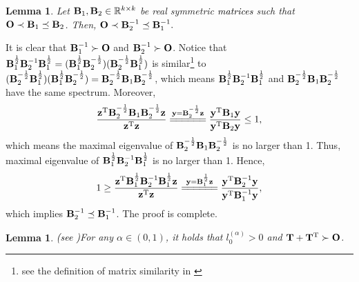 \documentclass[11pt]{article}%
\numberwithin{equation}{section}
\newtheorem{lemma}[theorem]{Lemma}
\newenvironment{proof}{\noindent{\bf Proof:}}{\hfill\fbox{}\vspace*{1mm}}
\begin{document}
\begin{lemma}\label{spdneqs}
	Let ${\bf B}_1,{\bf B}_2\in\mathbb{R}^{k\times k}$ be real symmetric \textcolor{black}{matrices} such that ${\bf O}\prec{\bf B}_1\preceq{\bf B}_2$. Then, ${\bf O}\prec{\bf B}_2^{-1}\preceq{\bf B}_1^{-1}.$
\end{lemma}
\begin{proof}	
	It is clear that ${\bf B}_1^{-1}\succ{\bf O}$ and ${\bf B}_2^{-1}\succ{\bf O}$.
	Notice that ${\bf B}_1^{\frac{1}{2}}{\bf B}_2^{-1}{\bf B}_1^{\frac{1}{2}}=({\bf B}_1^{\frac{1}{2}}{\bf B}_2^{-\frac{1}{2}})({\bf B}_2^{-\frac{1}{2}}{\bf B}_1^{\frac{1}{2}})$ is similar\footnote{see the definition of matrix similarity in \cite{horn2012matrix}} to $({\bf B}_2^{-\frac{1}{2}}{\bf B}_1^{\frac{1}{2}})({\bf B}_1^{\frac{1}{2}}{\bf B}_2^{-\frac{1}{2}})={\bf B}_2^{-\frac{1}{2}}{\bf B}_1{\bf B}_2^{-\frac{1}{2}}$, which means ${\bf B}_1^{\frac{1}{2}}{\bf B}_2^{-1}{\bf B}_1^{\frac{1}{2}}$ and ${\bf B}_2^{-\frac{1}{2}}{\bf B}_1{\bf B}_2^{-\frac{1}{2}}$ have the same spectrum.  Moreover,
	\begin{align*}
	\frac{{\bf z}^{\rm T}{\bf B}_2^{-\frac{1}{2}}{\bf B}_1{\bf B}_2^{-\frac{1}{2}}{\bf z}}{{\bf z}^{\rm T}{\bf z}}\stackrel{{\bf y}={\bf B}_2^{-\frac{1}{2}}{\bf z}}{=\joinrel=\joinrel=\joinrel=\joinrel=\joinrel=}\frac{{\bf y}^{\rm T}{\bf B}_1{\bf y}}{{\bf y}^{\rm T}{\bf B}_2{\bf y}}\leq 1,
	\end{align*}
	which means the maximal eigenvalue of ${\bf B}_2^{-\frac{1}{2}}{\bf B}_1{\bf B}_2^{-\frac{1}{2}}$ is no larger than 1. Thus, maximal eigenvalue of ${\bf B}_1^{\frac{1}{2}}{\bf B}_2^{-1}{\bf B}_1^{\frac{1}{2}}$ is no larger than 1.
	Hence, 
	\begin{align*}
	1\geq \frac{{\bf z}^{\rm T}{\bf B}_1^{\frac{1}{2}}{\bf B}_2^{-1}{\bf B}_1^{\frac{1}{2}}{\bf z}}{{\bf z}^{\rm T}{\bf z}}\stackrel{{\bf y}={\bf B}_1^{\frac{1}{2}}{\bf z}}{=\joinrel=\joinrel=\joinrel=\joinrel=\joinrel=}\frac{{\bf y}^{\rm T}{\bf B}_2^{-1}{\bf y}}{{\bf y}^{\rm T}{\bf B}_1^{-1}{\bf y}},
	\end{align*}
	which implies ${\bf B}_2^{-1}\preceq{\bf B}_1^{-1}$. The proof is complete.
\end{proof}

\begin{lemma}\textnormal{\textcolor{black}{(see \cite{lin2018separable})}}\label{timematspd}
	For any $\alpha\in(0,1)$, it holds that $l_0^{(\alpha)}>0$ and ${\bf T}+{\bf T}^{\rm T}\succ{\bf O}$.
\end{lemma}
\end{document}
